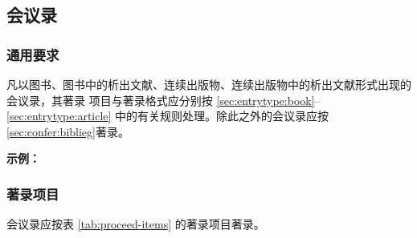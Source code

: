 \documentclass[twoside]{article}%
\begin{document}

\subsection{会议录}\label{sec:entrytype:proceed}

\subsubsection{通用要求}

凡以图书、图书中的析出文献、连续出版物、连续出版物中的析出文献形式出现的会议录，其著录
项目与著录格式应分别按 \ref{sec:entrytype:book}--\ref{sec:entrytype:article} 中的有关规则处理。除此之外的会议录应按\ref{sec:confer:biblieg}著录。

\begin{refsection}
\nocite{%
牛志明2012--,汪学军2002-22-25,肖希明2024民国}
\nocite{%
Yufin2000--}
\nocite{%
FOURNEY1971-17-38}

{

\mbox{}{\small\textbf{示例：} \par}

{\printbibliography[heading=none,env=indentegenv]}
}
\end{refsection}

\subsubsection{著录项目}
会议录应按表 \ref{tab:proceed-items} 的著录项目著录。
\end{document}
